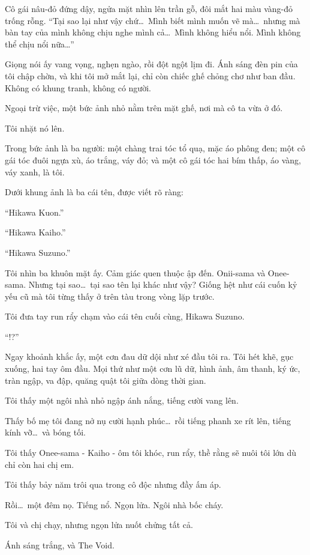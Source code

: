\documentclass[../main.tex]{subfiles}
\begin{document}
Cô gái nâu-đỏ đứng dậy, ngửa mặt nhìn lên trần gỗ, đôi mắt hai màu vàng-đỏ trống rỗng. ``Tại sao lại như vậy chứ\dots\ Mình biết mình muốn vẽ mà\dots\ nhưng mà bàn tay của mình không chịu nghe mình cả\dots\ Mình không hiểu nổi. Mình không thể chịu nổi nữa\dots''

Giọng nói ấy vang vọng, nghẹn ngào, rồi đột ngột lịm đi. Ánh sáng đèn pin của tôi chập chờn, và khi tôi mở mắt lại, chỉ còn chiếc ghế chỏng chơ như ban đầu. Không có khung tranh, không có người.

Ngoại trừ việc, một bức ảnh nhỏ nằm trên mặt ghế, nơi mà cô ta vừa ở đó.

Tôi nhặt nó lên.

Trong bức ảnh là ba người: một chàng trai tóc tổ quạ, mặc áo phông đen; một cô gái tóc đuôi ngựa xù, áo trắng, váy đỏ; và một cô gái tóc hai bím thấp, áo vàng, váy xanh, là tôi.

Dưới khung ảnh là ba cái tên, được viết rõ ràng:

``Hikawa Kuon.''

``Hikawa Kaiho.''

``Hikawa Suzuno.''

Tôi nhìn ba khuôn mặt ấy. Cảm giác quen thuộc ập đến. Onii-sama và Onee-sama. Nhưng tại sao\dots\ tại sao tên lại khác như vậy? Giống hệt như cái cuốn kỷ yếu cũ mà tôi từng thấy ở trên tàu trong vòng lặp trước.

Tôi đưa tay run rẩy chạm vào cái tên cuối cùng, Hikawa Suzuno.

``!?''

Ngay khoảnh khắc ấy, một cơn đau dữ dội như xé đầu tôi ra. Tôi hét khẽ, gục xuống, hai tay ôm đầu. Mọi thứ như một cơn lũ dữ, hình ảnh, âm thanh, ký ức, tràn ngập, va đập, quăng quật tôi giữa dòng thời gian.

Tôi thấy một ngôi nhà nhỏ ngập ánh nắng, tiếng cười vang lên.

Thấy bố mẹ tôi đang nở nụ cười hạnh phúc\dots\ rồi tiếng phanh xe rít lên, tiếng kính vỡ\dots\ và bóng tối.

Tôi thấy Onee-sama - Kaiho - ôm tôi khóc, run rẩy, thề rằng sẽ nuôi tôi lớn dù chỉ còn hai chị em.

Tôi thấy bảy năm trôi qua trong cô độc nhưng đầy ấm áp.

Rồi\dots\ một đêm nọ. Tiếng nổ. Ngọn lửa. Ngôi nhà bốc cháy.

Tôi và chị chạy, nhưng ngọn lửa nuốt chửng tất cả.

Ánh sáng trắng, và The Void.
\end{document}
